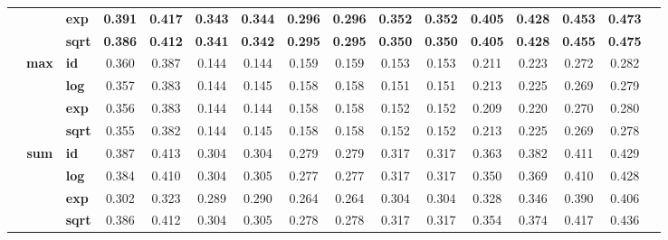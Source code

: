 \begin{table}[t]
{\begin{tabular}{cclccccccccccccc}
                & & \textbf{exp}  & \textbf{0.391} & \textbf{0.417} & \textbf{0.343} & \textbf{0.344} & \textbf{0.296} & \textbf{0.296} & \textbf{0.352} & \textbf{0.352} & \textbf{0.405} & \textbf{0.428} & \textbf{0.453} & \textbf{0.473} \\
                & & \textbf{sqrt} & \textbf{0.386} & \textbf{0.412} & \textbf{0.341} & \textbf{0.342} & \textbf{0.295} & \textbf{0.295} & \textbf{0.350} & \textbf{0.350} & \textbf{0.405} & \textbf{0.428} & \textbf{0.455} & \textbf{0.475} \\
        \cmidrule{2-15}
        & \multirow{4}{*}{\textbf{max}}
                  & \textbf{id}   & 0.360 & 0.387 & 0.144 & 0.144 & 0.159 & 0.159 & 0.153 & 0.153 & 0.211 & 0.223 & 0.272 & 0.282 \\
                & & \textbf{log}  & 0.357 & 0.383 & 0.144 & 0.145 & 0.158 & 0.158 & 0.151 & 0.151 & 0.213 & 0.225 & 0.269 & 0.279 \\
                & & \textbf{exp}  & 0.356 & 0.383 & 0.144 & 0.144 & 0.158 & 0.158 & 0.152 & 0.152 & 0.209 & 0.220 & 0.270 & 0.280 \\
                & & \textbf{sqrt} & 0.355 & 0.382 & 0.144 & 0.145 & 0.158 & 0.158 & 0.152 & 0.152 & 0.213 & 0.225 & 0.269 & 0.278 \\
        \cmidrule{2-15}
        & \multirow{4}{*}{\textbf{sum}}
                  & \textbf{id}   & 0.387 & 0.413 & 0.304 & 0.304 & 0.279 & 0.279 & 0.317 & 0.317 & 0.363 & 0.382 & 0.411 & 0.429 \\
                & & \textbf{log}  & 0.384 & 0.410 & 0.304 & 0.305 & 0.277 & 0.277 & 0.317 & 0.317 & 0.350 & 0.369 & 0.410 & 0.428 \\
                & & \textbf{exp}  & 0.302 & 0.323 & 0.289 & 0.290 & 0.264 & 0.264 & 0.304 & 0.304 & 0.328 & 0.346 & 0.390 & 0.406 \\
                & & \textbf{sqrt} & 0.386 & 0.412 & 0.304 & 0.305 & 0.278 & 0.278 & 0.317 & 0.317 & 0.354 & 0.374 & 0.417 & 0.436 \\
        \midrule


\end{tabular}}
\end{table}
